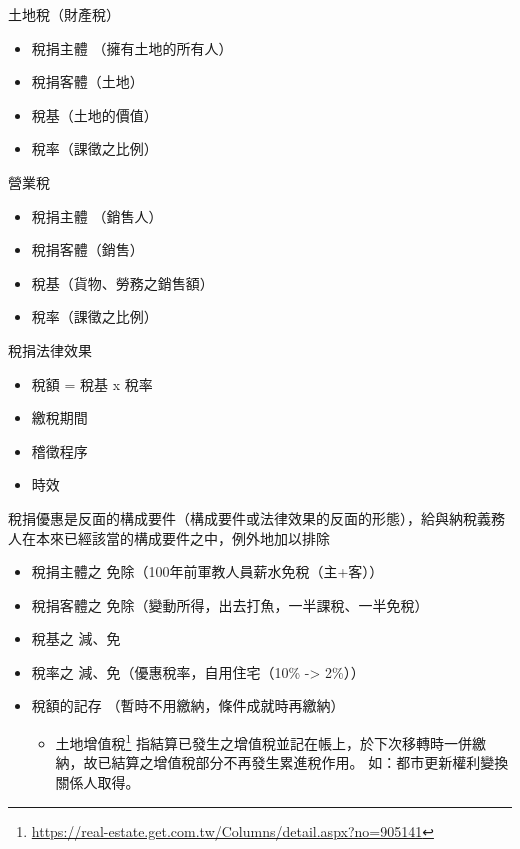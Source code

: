 \documentclass[]{ctexbook}
\providecommand{\tightlist}{%
  \setlength{\itemsep}{0pt}\setlength{\parskip}{0pt}}
\renewcommand{\href}[2]{#2\footnote{\url{#1}}}
\begin{document}
土地稅（財產稅）

\begin{itemize}
\tightlist
\item
  稅捐主體 （擁有土地的所有人）
\item
  稅捐客體（土地）
\item
  稅基（土地的價值）
\item
  稅率（課徵之比例）
\end{itemize}

營業稅

\begin{itemize}
\tightlist
\item
  稅捐主體 （銷售人）
\item
  稅捐客體（銷售）
\item
  稅基（貨物、勞務之銷售額）
\item
  稅率（課徵之比例）
\end{itemize}

稅捐法律效果

\begin{itemize}
\tightlist
\item
  稅額 = 稅基 x 稅率
\item
  繳稅期間
\item
  稽徵程序
\item
  時效
\end{itemize}

稅捐優惠是反面的構成要件（構成要件或法律效果的反面的形態），給與納稅義務人在本來已經該當的構成要件之中，例外地加以排除

\begin{itemize}
\tightlist
\item
  稅捐主體之 免除（100年前軍教人員薪水免稅（主+客））
\item
  稅捐客體之 免除（變動所得，出去打魚，一半課稅、一半免稅）
\item
  稅基之 減、免
\item
  稅率之 減、免（優惠稅率，自用住宅（10\% -\textgreater{} 2\%））
\item
  稅額的記存 （暫時不用繳納，條件成就時再繳納）

  \begin{itemize}
  \tightlist
  \item
    \href{https://real-estate.get.com.tw/Columns/detail.aspx?no=905141}{土地增值稅} 指結算已發生之增值稅並記在帳上，於下次移轉時一併繳納，故已結算之增值稅部分不再發生累進稅作用。 如：都市更新權利變換關係人取得。
  \end{itemize}
\end{itemize}
\end{document}
